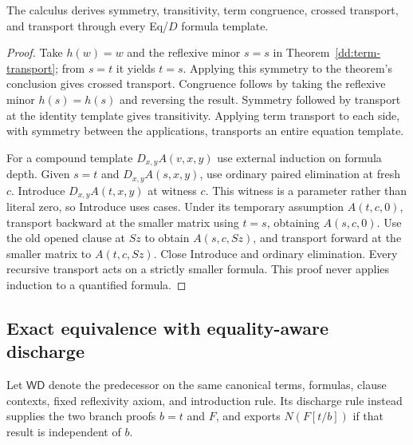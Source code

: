 \begin{corollary}
\label{dd:full-equality}
The calculus derives symmetry, transitivity, term congruence, crossed
transport, and transport through every Eq/$D$ formula template.
\end{corollary}
\begin{proof}
Take $h(w)=w$ and the reflexive minor $s=s$ in
Theorem~\ref{dd:term-transport}; from $s=t$ it yields $t=s$.  Applying this
symmetry to the theorem's conclusion gives crossed transport.  Congruence
follows by taking the reflexive minor $h(s)=h(s)$ and reversing the
result.  Symmetry followed by transport at the identity template gives
transitivity.  Applying term transport to each side, with symmetry between
the applications, transports an entire equation template.

For a compound template $D_{x,y}A(v,x,y)$ use external induction on formula
depth.  Given $s=t$ and $D_{x,y}A(s,x,y)$, use ordinary paired elimination
at fresh $c$.  Introduce $D_{x,y}A(t,x,y)$ at witness $c$.  This witness is
a parameter rather than literal zero, so Introduce uses cases.  Under its
temporary assumption $A(t,c,0)$, transport backward at the smaller matrix
using $t=s$, obtaining $A(s,c,0)$.  Use the old opened clause at $Sz$ to
obtain $A(s,c,Sz)$, and transport forward at the smaller matrix to
$A(t,c,Sz)$.  Close Introduce and ordinary elimination.  Every recursive
transport acts on a strictly smaller formula.  This proof never applies
induction to a quantified formula.
\end{proof}

\subsection{Exact equivalence with equality-aware discharge}

Let $\mathsf{WD}$ denote the predecessor on the same canonical terms,
formulas, clause contexts, fixed reflexivity axiom, and introduction rule.
Its discharge rule instead supplies the two branch proofs $b=t$ and $F$,
and exports $N(F[t/b])$ if that result is independent of $b$.

